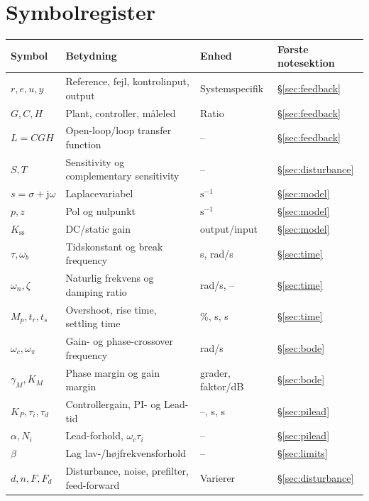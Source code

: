 \section{Symbolregister}

\begin{tabularx}{\textwidth}{@{}p{}Y p{.18\textwidth}p{.23\textwidth}@{}}
\toprule
Symbol & Betydning & Enhed & Første notesektion \\
\midrule
\(r,e,u,y\) & Reference, fejl, kontrolinput, output & Systemspecifik & \S\ref{sec:feedback}\\
\(G,C,H\) & Plant, controller, måleled & Ratio & \S\ref{sec:feedback}\\
\(L=CGH\) & Open-loop/loop transfer function & -- & \S\ref{sec:feedback}\\
\(S,T\) & Sensitivity og complementary sensitivity & -- & \S\ref{sec:disturbance}\\
\(s=\sigma+\mathrm{j}\omega\) & Laplacevariabel & \(\mathrm{s}^{-1}\) & \S\ref{sec:model}\\
\(p,z\) & Pol og nulpunkt & \(\mathrm{s}^{-1}\) & \S\ref{sec:model}\\
\(K_{\mathrm{ss}}\) & DC/static gain & output/input & \S\ref{sec:model}\\
\(\tau,\omega_b\) & Tidskonstant og break frequency & s, rad/s & \S\ref{sec:time}\\
\(\omega_n,\zeta\) & Naturlig frekvens og damping ratio & rad/s, -- & \S\ref{sec:time}\\
\(M_p,t_r,t_s\) & Overshoot, rise time, settling time & \%, s, s & \S\ref{sec:time}\\
\(\omega_c,\omega_\pi\) & Gain- og phase-crossover frequency & rad/s & \S\ref{sec:bode}\\
\(\gamma_M,K_M\) & Phase margin og gain margin & grader, faktor/dB & \S\ref{sec:bode}\\
\(K_P,\tau_i,\tau_d\) & Controllergain, PI- og Lead-tid & --, s, s & \S\ref{sec:pilead}\\
\(\alpha,N_i\) & Lead-forhold, \(\omega_c\tau_i\) & -- & \S\ref{sec:pilead}\\
\(\beta\) & Lag lav-/højfrekvensforhold & -- & \S\ref{sec:limits}\\
\(d,n,F,F_d\) & Disturbance, noise, prefilter, feed-forward & Varierer & \S\ref{sec:disturbance}\\
\bottomrule
\end{tabularx}
